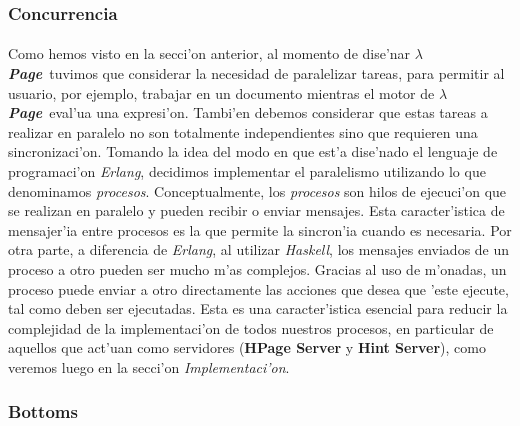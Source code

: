 \documentclass[a4paper]{article}
\newcommand{\haskell}{\textsl{Haskell}}
\newcommand{\hpage}{\textbf{\textsl{$\lambda$Page}}}
\begin{document}
\subsubsection{Concurrencia}
\paragraph{}Como hemos visto en la secci'on anterior, al momento de dise'nar \hpage\ tuvimos que considerar la necesidad de paralelizar tareas, para permitir al usuario, por ejemplo, trabajar en un documento mientras el motor de \hpage\ eval'ua una expresi'on.  Tambi'en debemos considerar que estas tareas a realizar en paralelo no son totalmente independientes sino que requieren una sincronizaci'on.  Tomando la idea del modo en que est'a dise'nado el lenguaje de programaci'on \textsl{Erlang}, decidimos implementar el paralelismo utilizando lo que denominamos \textsl{procesos}.  Conceptualmente, los \textsl{procesos} son hilos de ejecuci'on que se realizan en paralelo y pueden recibir o enviar mensajes.   Esta caracter'istica de mensajer'ia entre procesos es la que permite la sincron'ia cuando es necesaria.  Por otra parte, a diferencia de \textsl{Erlang}, al utilizar \haskell, los mensajes enviados de un proceso a otro pueden ser mucho m'as complejos.  Gracias al uso de m'onadas, un proceso puede enviar a otro directamente las acciones que desea que 'este ejecute, tal como deben ser ejecutadas.  Esta es una caracter'istica esencial para reducir la complejidad de la implementaci'on de todos nuestros procesos, en particular de aquellos que act'uan como servidores (\textbf{HPage Server} y \textbf{Hint Server}), como veremos luego en la secci'on \textsl{Implementaci'on}.
\subsubsection{Bottoms}
\end{document}
